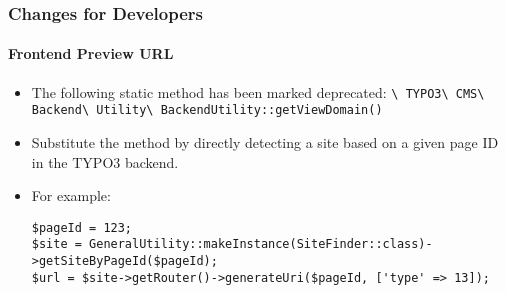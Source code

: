 
\begin{frame}[fragile]
	\frametitle{Changes for Developers}
	\framesubtitle{Frontend Preview URL}

	\lstset{basicstyle=\tiny\ttfamily}

	\begin{itemize}
		\item The following static method has been marked deprecated:\newline
			\smaller\texttt{\textbackslash
				TYPO3\textbackslash
				CMS\textbackslash
				Backend\textbackslash
				Utility\textbackslash
				BackendUtility::getViewDomain()}\normalsize

		\item Substitute the method by directly detecting a site based on a given page ID in the TYPO3 backend.
		\item For example:

\begin{lstlisting}
$pageId = 123;
$site = GeneralUtility::makeInstance(SiteFinder::class)->getSiteByPageId($pageId);
$url = $site->getRouter()->generateUri($pageId, ['type' => 13]);
\end{lstlisting}

	\end{itemize}

\end{frame}


